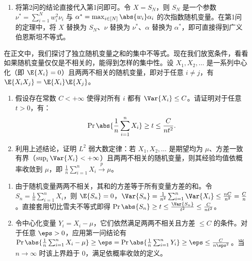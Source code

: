 \begin{solution}
\begin{enumerate}
        \item 将第2问的结论直接代入第1问即可。令 $X = S_N$，则 $S_N$ 是一个参数 $\nu^* = \sum_{i=1}^N w_i^2 \nu_i$ 与 $\alpha^* = \max_{i \in [N]} \abs{w_i} \alpha_i$ 的次指数随机变量。在第1问的定理中，将 $X$ 替换为 $S_N$、$\nu$ 替换为 $\nu^*$、$\alpha$ 替换为 $\alpha^*$，即可直接得到广义伯恩斯坦不等式。
    \end{enumerate}
\end{solution}

\begin{exercise}
在正文中，我们探讨了独立随机变量之和的集中不等式。现在我们放宽条件，看看如果随机变量仅仅是不相关的，能得到怎样的集中性。设 $X_1, X_2, \dots$ 是一系列中心化（即 $\E{X_i} = 0$）且两两不相关的随机变量，即对于任意 $i \neq j$，有 $\E{X_i X_j} = \E{X_i}\E{X_j}$。
\begin{enumerate}
    \item 假设存在常数 $C < +\infty$ 使得对所有 $i$ 都有 $\Var{X_i} \le C$。请证明对于任意 $t > 0$，有：
    \[
        \Pr{\abs{\frac{1}{n} \sum_{i=1}^n X_i} \ge t} \le \frac{C}{n t^2}.
    \]
    \item 利用上述结论，证明 $L^2$ 弱大数定律：若 $X_1, X_2, \dots$ 是期望均为 $\mu$、方差一致有界（$\sup_i \Var{X_i} < +\infty$）且两两不相关的随机变量，则其经验均值依概率收敛到 $\mu$，即 $\frac{1}{n} \sum_{i=1}^n X_i \xrightarrow{p} \mu$。
\end{enumerate}
\end{exercise}
\begin{solution}
    \begin{enumerate}
        \item 由于随机变量两两不相关，其和的方差等于所有变量方差的和。令 $S_n = \frac{1}{n}\sum_{i=1}^n X_i$，则 $\E{S_n} = 0$，$\Var{S_n} = \frac{1}{n^2} \sum_{i=1}^n \Var{X_i} \le \frac{nC}{n^2} = \frac{C}{n}$。直接套用切比雪夫不等式即得 $\Pr{\abs{S_n} \ge t} \le \frac{\Var{S_n}}{t^2} \le \frac{C}{nt^2}$。
        \item 令中心化变量 $Y_i = X_i - \mu$，它们依然满足两两不相关且方差 $\le C$ 的条件。对于任意 $\eps > 0$，应用第一问结论有 $\Pr{\abs{\frac{1}{n}\sum_{i=1}^n X_i - \mu} \ge \eps} = \Pr{\abs{\frac{1}{n}\sum_{i=1}^n Y_i} \ge \eps} \le \frac{C}{n\eps^2}$。当 $n \to \infty$ 时该上界趋于 $0$，满足依概率收敛的定义。
    \end{enumerate}
\end{solution}

